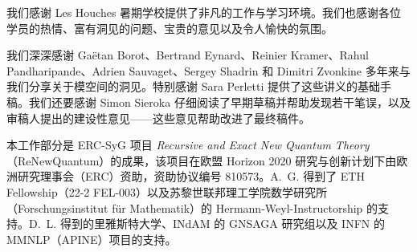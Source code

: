 \medskip
{} 我们感谢 Les Houches 暑期学校提供了非凡的工作与学习环境。我们也感谢各位学员的热情、富有洞见的问题、宝贵的意见以及令人愉快的氛围。

我们深深感谢 Ga\"etan Borot、Bertrand Eynard、Reinier Kramer、Rahul Pandharipande、Adrien Sauvaget、Sergey Shadrin 和 Dimitri Zvonkine 多年来与我们分享关于模空间的洞见。特别感谢 Sara Perletti 提供了这些讲义的基础手稿。我们还要感谢 Simon Sieroka 仔细阅读了早期草稿并帮助发现若干笔误，以及审稿人提出的建设性意见——这些意见帮助改进了最终稿件。

\medskip
{} 本工作部分是 ERC-SyG 项目 \emph{Recursive and Exact New Quantum Theory}（ReNewQuantum）的成果，该项目在欧盟 Horizon 2020 研究与创新计划下由欧洲研究理事会（ERC）资助，资助协议编号 810573。A.~G. 得到了 ETH Fellowship（22-2 FEL-003）以及苏黎世联邦理工学院数学研究所（Forschungsinstitut f\"ur Mathematik）的 Hermann-Weyl-Instructorship 的支持。D.~L. 得到的里雅斯特大学、INdAM 的 GNSAGA 研究组以及 INFN 的 MMNLP（APINE）项目的支持。


